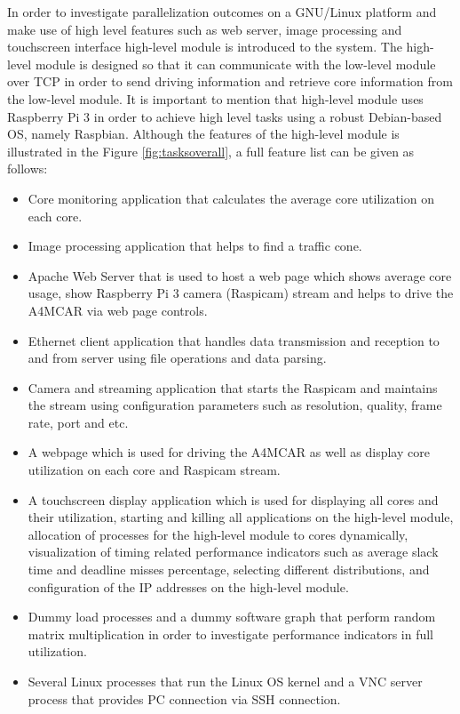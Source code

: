 In order to investigate parallelization outcomes on a GNU/Linux platform and make use of high level features such as web server, image processing and touchscreen interface high-level module is introduced to the system. The high-level module is designed so that it can communicate with the low-level module over TCP in order to send driving information and retrieve core information from the low-level module. It is important to mention that high-level module uses Raspberry Pi 3 in order to achieve high level tasks using a robust Debian-based OS, namely Raspbian. Although the features of the high-level module is illustrated in the Figure \ref{fig:tasksoverall}, a full feature list can be given as follows:
\begin{itemize}
	\item Core monitoring application that calculates the average core utilization  on each core.
	\item Image processing application that helps to find a traffic cone.
	\item Apache Web Server that is used to host a web page which shows average core usage, show Raspberry Pi 3 camera (Raspicam) stream and helps to drive the A4MCAR via web page controls.
	\item Ethernet client application that handles data transmission and reception to and from server using file operations and data parsing.
	\item Camera and streaming application that starts the Raspicam and maintains the stream using configuration parameters such as resolution, quality, frame rate, port and etc.
	\item A webpage which is used for driving the A4MCAR as well as display core utilization on each core and Raspicam stream.
	\item A touchscreen display application which is used for displaying all cores and their utilization, starting and killing all applications on the high-level module, allocation of processes for the high-level module to cores dynamically, visualization of timing related performance indicators such as average slack time and deadline misses percentage, selecting different distributions, and configuration of the IP addresses on the high-level module.
	\item Dummy load processes and a dummy software graph that perform random matrix multiplication in order to investigate performance indicators in full utilization.
	\item Several Linux processes that run the Linux OS kernel and a VNC server process that provides PC connection via SSH connection.
\end{itemize}
